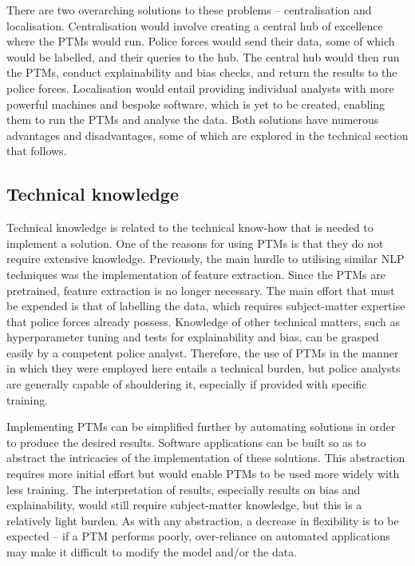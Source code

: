 There are two overarching solutions to these problems – centralisation and localisation. Centralisation would involve creating a central hub of excellence where the PTMs would run. Police forces would send their data, some of which would be labelled, and their queries to the hub. The central hub would then run the PTMs, conduct explainability and bias checks, and return the results to the police forces. Localisation would entail providing individual analysts with more powerful machines and bespoke software, which is yet to be created, enabling them to run the PTMs and analyse the data. Both solutions have numerous advantages and disadvantages, some of which are explored in the technical section that follows. 
    

\subsection{Technical knowledge} Technical knowledge is related to the technical know-how that is needed to implement a solution. One of the reasons for using PTMs is that they do not require extensive knowledge. Previously, the main hurdle to utilising similar NLP techniques was the implementation of feature extraction. Since the PTMs are pretrained, feature extraction is no longer necessary. The main effort that must be expended is that of labelling the data, which requires subject-matter expertise that police forces already possess. Knowledge of other technical matters, such as hyperparameter tuning and tests for explainability and bias, can be grasped easily by a competent police analyst. Therefore, the use of PTMs in the manner in which they were employed here entails a technical burden, but police analysts are generally capable of shouldering it, especially if provided with specific training. 

Implementing PTMs can be simplified further by automating solutions in order to produce the desired results. Software applications can be built so as to abstract the intricacies of the implementation of these solutions. This abstraction requires more initial effort but would enable PTMs to be used more widely with less training. The interpretation of results, especially results on bias and explainability, would still require subject-matter knowledge, but this is a relatively light burden. As with any abstraction, a decrease in flexibility is to be expected – if a PTM performs poorly, over-reliance on automated applications may make it difficult to modify the model and/or the data.

